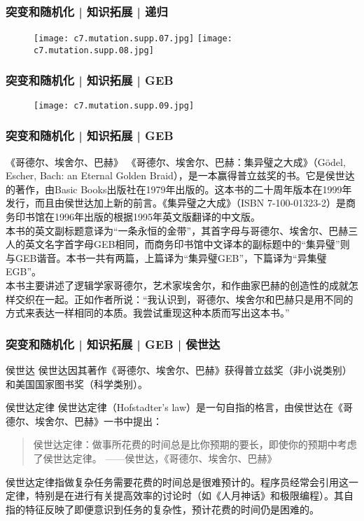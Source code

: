 \begin{frame}
  \frametitle{突变和随机化 | 知识拓展 | 递归}
  \begin{figure}
    \centering
    \texttt{[image: c7.mutation.supp.07.jpg]}\quad
    \texttt{[image: c7.mutation.supp.08.jpg]}
  \end{figure}
\end{frame}

\begin{frame}
  \frametitle{突变和随机化 | 知识拓展 | GEB}
  \begin{figure}
    \centering
    \texttt{[image: c7.mutation.supp.09.jpg]}
  \end{figure}
\end{frame}

\begin{frame}
  \frametitle{突变和随机化 | 知识拓展 | GEB}
  \begin{block}{《哥德尔、埃舍尔、巴赫》}
    《哥德尔、埃舍尔、巴赫：集异璧之大成》（Gödel, Escher, Bach: an Eternal Golden Braid），是一本赢得普立兹奖的书。它是侯世达的著作，由Basic Books出版社在1979年出版的。这本书的二十周年版本在1999年发行，而且由侯世达加上新的前言。《集异璧之大成》（ISBN 7-100-01323-2）是商务印书馆在1996年出版的根据1995年英文版翻译的中文版。\\
    \vspace{0.3em}
本书的英文副标题意译为“一条永恒的金带”，其首字母与哥德尔、埃舍尔、巴赫三人的英文名字首字母GEB相同，而商务印书馆中文译本的副标题中的“集异璧”则与GEB谐音。本书一共有两篇，上篇译为“集异璧GEB”，下篇译为“异集璧EGB”。 \\
    \vspace{0.3em}
本书主要讲述了逻辑学家哥德尔，艺术家埃舍尔，和作曲家巴赫的创造性的成就怎样交织在一起。正如作者所说：“我认识到，哥德尔、埃舍尔和巴赫只是用不同的方式来表达一样相同的本质。我尝试重现这种本质而写出这本书。”
  \end{block}
\end{frame}

\begin{frame}
  \frametitle{突变和随机化 | 知识拓展 | GEB | 侯世达}
  \begin{block}{侯世达}
    侯世达因其著作《哥德尔、埃舍尔、巴赫》获得普立兹奖（非小说类别）和美国国家图书奖（科学类别）。
  \end{block}
  \begin{block}{\alert{侯世达定律}}
    侯世达定律（Hofstadter's law）是一句自指的格言，由侯世达在《哥德尔、埃舍尔、巴赫》一书中提出：
    \begin{quote}
    侯世达定律：做事所花费的时间总是比你预期的要长，即使你的预期中考虑了侯世达定律。 ——侯世达，《哥德尔、埃舍尔、巴赫》
    \end{quote}
侯世达定律指做复杂任务需要花费的时间总是很难预计的。程序员经常会引用这一定律，特别是在进行有关提高效率的讨论时（如《人月神话》和极限编程）。其自指的特征反映了即便意识到任务的复杂性，预计花费的时间仍是困难的。
  \end{block}
\end{frame}

